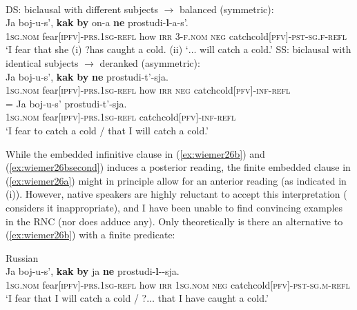 \documentclass[output=paper,colorlinks,citecolor=brown]{langscibook}
\begin{document}
\newpage
\ea \textnormal{} \\
\label{ex:wiemer26} 
\ea \label{ex:wiemer26a} \textnormal{DS: biclausal with different subjects $\rightarrow$ balanced (symmetric):} \\
\gll Ja boj-u-s', \textbf{kak} \textbf{by} on-a \textbf{ne} prostudi-\textbf{l}-a-s'. \\
\textsc{1sg.nom} fear\textsc{[ipfv]-prs.1sg-refl} how \textsc{irr} 3-\textsc{f.nom} \textsc{neg} catch\textunderscore cold\textsc{[pfv]-pst-sg.f-refl} \\
\glt `I fear that she (i) ?has caught a cold. (ii) `$\ldots$ will catch a cold.'
\ex \label{ex:wiemer26b} \textnormal{SS: biclausal with identical subjects $\rightarrow$ deranked (asymmetric):} \\
\gll Ja boj-u-s', \textbf{kak} \textbf{by} \textbf{ne} prostudi-t'-sja. \\
\textsc{1sg.nom} fear\textsc{[ipfv]-prs.1sg-refl} how \textsc{irr} \textsc{neg} catch\textunderscore cold\textsc{[pfv]-inf-refl} \\
\ex \label{ex:wiemer26bsecond}
\gll = Ja boj-u-s' prostudi-t'-sja. \\
{} \textsc{1sg.nom} fear\textsc{[ipfv]-prs.1sg-refl} catch\textunderscore cold\textsc{[pfv]-inf-refl} \\
\glt `I fear to catch a cold / that I will catch a cold.'
\z
\z


\noindent While the embedded infinitive clause in (\ref{ex:wiemer26b}) and (\ref{ex:wiemer26bsecond}) induces a posterior reading, the finite embedded clause in (\ref{ex:wiemer26a}) might in principle allow for an anterior reading (as indicated in (i)). However, native speakers are highly reluctant to accept this interpretation (\citealt[282]{Dobrushina2016} considers it inappropriate), and I have been unable to find convincing examples in the RNC (nor does \citealt{Nilsson2012} adduce any). Only theoretically is there an alternative to (\ref{ex:wiemer26b}) with a finite predicate:


\ea 
\label{ex:wiemer26c} \textnormal{Russian} \\
\gll Ja boj-u-s', \textbf{kak} \textbf{by} ja \textbf{ne} prostudi-\textbf{l}-\emptyset-sja. \\
\textsc{1sg.nom} fear\textsc{[ipfv]-prs.1sg-refl} how \textsc{irr} \textsc{1sg.nom} \textsc{neg} catch\textunderscore cold\textsc{[pfv]-pst-sg.m-refl} \\
\glt `I fear that I will catch a cold / ?$\ldots$ that I have caught a cold.'
\z
\end{document}
